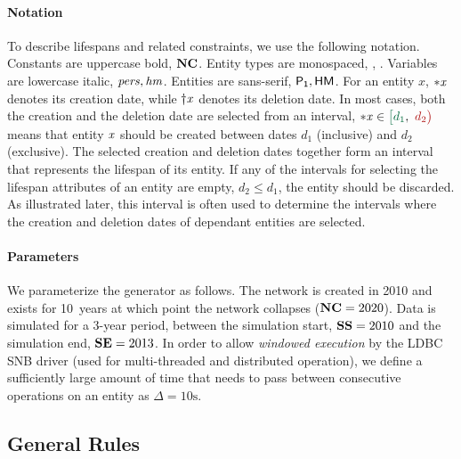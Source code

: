 \paragraph{Notation}
To describe lifespans and related constraints, we use the following notation.
Constants are uppercase bold, \eg $\textbf{NC}$.
Entity types are monospaced, \eg \tPerson, \tHasMember.
Variables are lowercase italic, \eg $\mathit{pers}, \mathit{hm}$.
Entities are sans-serif, \eg $\mathsf{P_1}, \mathsf{HM}$.
For an entity $x$, ${\ast}\mathit{x}{}$ denotes its creation date, while ${\dagger}\mathit{x}{}$ denotes its deletion date.
In most cases, both the creation and the deletion date are selected from an interval, \eg $\varc{x}{} \in \interval{d_1}{d_2}$ means that entity $\mathit{x}$ should be created between dates $d_1$ (inclusive) and $d_2$ (exclusive). 
The selected creation and deletion dates together form an interval that represents the lifespan of its entity.
If any of the intervals for selecting the lifespan attributes of an entity are empty, \ie $d_2 \leq d_1$, the entity should be discarded.
As illustrated later, this interval is often used to determine the intervals where the creation and deletion dates of dependant entities are selected.

\paragraph{Parameters} %
We parameterize the generator as follows.
The network is created in 2010 and exists for 10~years at which point the network collapses ($\textbf{NC} = 2020$).
Data is simulated for a 3-year period, between the simulation start, $\textbf{SS} = 2010$ and the simulation end, $\textbf{SE} = 2013$.
In order to allow \emph{windowed execution} by the LDBC SNB driver (used for multi-threaded and distributed operation), we define a sufficiently large amount of time that needs to pass between consecutive operations on an entity as $\Delta = 10\text{s}$.


\subsection{General Rules}

